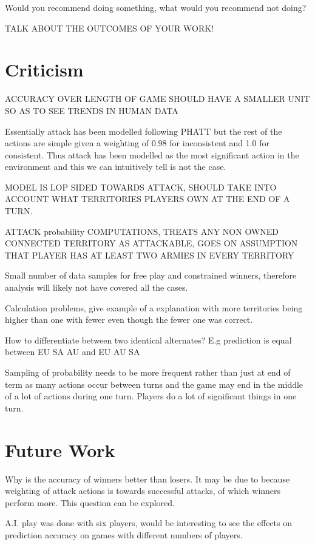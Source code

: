 \documentclass[parskip]{cs4rep}
\begin{document}
Would you recommend doing something, what would you recommend not doing?

TALK ABOUT THE OUTCOMES OF YOUR WORK!

\section{Criticism}

ACCURACY OVER LENGTH OF GAME SHOULD HAVE A SMALLER UNIT SO AS TO SEE TRENDS IN HUMAN DATA

Essentially attack has been modelled following PHATT but the rest of the actions are simple given a weighting of 0.98 for inconsistent and 1.0 for consistent. Thus attack has been modelled as the most significant action in the environment and this we can intuitively tell is not the case.

MODEL IS LOP SIDED TOWARDS ATTACK, SHOULD TAKE INTO ACCOUNT WHAT TERRITORIES PLAYERS OWN AT THE END OF A TURN.

ATTACK probability COMPUTATIONS, TREATS ANY NON OWNED CONNECTED TERRITORY AS ATTACKABLE, GOES ON ASSUMPTION THAT PLAYER HAS AT LEAST TWO ARMIES IN EVERY TERRITORY

Small number of data samples for free play and constrained winners, therefore analysis will likely not have covered all the cases.

Calculation problems, give example of a explanation with more territories being higher than one with fewer even though the fewer one was correct.

How to differentiate between two identical alternates? E.g prediction is equal between EU SA AU and EU AU SA 

Sampling of probability needs to be more frequent rather than just at end of term as many actions occur between turns and the game may end in the middle of a lot of actions during one turn. Players do a lot of significant things in one turn.

\section{Future Work}

Why is the accuracy of winners better than losers. It may be due to because weighting of attack actions is towards successful attacks, of which winners perform more. This question can be explored.

A.I. play was done with six players, would be interesting to see the effects on prediction accuracy on games with different numbers of players.
\end{document}
